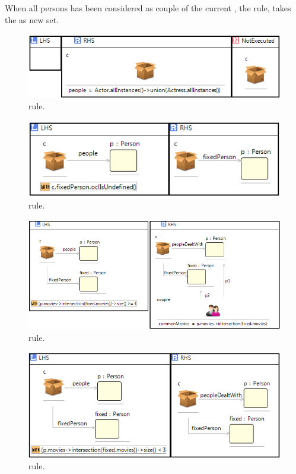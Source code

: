 When all persons has been considered as couple of the current , the  rule, takes the  as new  set. 

\begin{figure}[htp]
  \centering
  \includegraphics[width=.8\textwidth]{imgs/initialRule}
  \caption{ rule.}\label{fig:initialRule}
\end{figure}

\begin{figure}[htp]
  \centering
  \includegraphics[width=.75\textwidth]{imgs/fixPerson}
  \caption{ rule.}\label{fig:fixPerson}
\end{figure}

\begin{figure}[htp]
  \centering
  \includegraphics[width=\textwidth]{imgs/areCouple}
  \caption{ rule.}\label{fig:areCouple}
\end{figure}

\begin{figure}[htp]
  \centering
  \includegraphics[width=.8\textwidth]{imgs/areNotCouple}
  \caption{ rule.}\label{fig:areNotCouple}
\end{figure}

